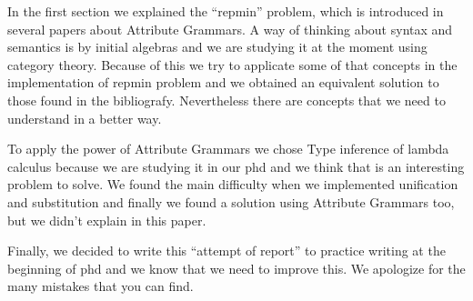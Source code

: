 \documentclass[a4paper,10pt]{article}
\begin{document}
  In the first section we explained the ``repmin'' problem, which is introduced in several papers
  about Attribute Grammars. A way of thinking about syntax and semantics is by initial algebras and
  we are studying it at the moment using category theory. Because of this we try to applicate
  some of that concepts in the implementation of repmin problem and we obtained an equivalent 
  solution to those found in the bibliografy. Nevertheless there are concepts that we need
  to understand in a better way.
  
  To apply the power of Attribute Grammars we chose Type inference of lambda calculus because we
  are studying it in our phd and we think that is an interesting problem to solve. We found the main difficulty
  when we implemented unification and substitution and finally we found a solution using Attribute Grammars too,
  but we didn't explain in this paper.
  
  Finally, we decided to write this ``attempt of report'' to practice writing at the beginning of phd and we know
  that we need to improve this. We apologize for the many mistakes that you can find.
  
  
  
   
\end{document}
